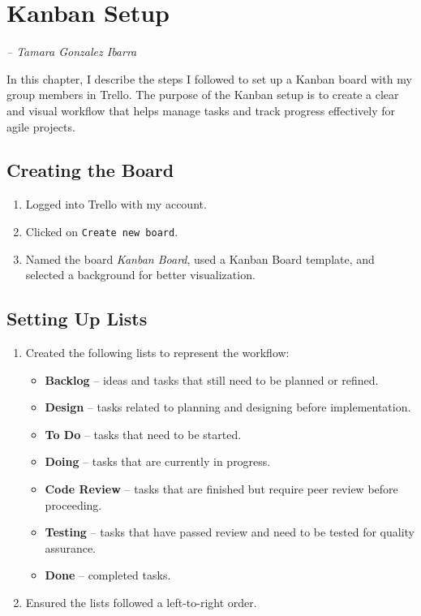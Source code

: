 \chapter{Kanban Setup}
\label{Chapter::KanbanSetup}

\begin{flushleft}
\small{\textit{-- Tamara Gonzalez Ibarra}}
\end{flushleft}

In this chapter, I describe the steps I followed to set up a Kanban board with my group members in Trello. 
The purpose of the Kanban setup is to create a clear and visual workflow that helps manage tasks and track progress effectively for agile projects. 

\section{Creating the Board}
\begin{enumerate}
    \item Logged into Trello with my account.
    \item Clicked on \texttt{Create new board}.
    \item Named the board \textit{Kanban Board}, used a Kanban Board template, and selected a background for better visualization.
\end{enumerate}

\section{Setting Up Lists}
\begin{enumerate}
    \item Created the following lists to represent the workflow:
    \begin{itemize}
        \item \textbf{Backlog} – ideas and tasks that still need to be planned or refined.
        \item \textbf{Design} – tasks related to planning and designing before implementation.
        \item \textbf{To Do} – tasks that need to be started.
        \item \textbf{Doing} – tasks that are currently in progress.
        \item \textbf{Code Review} – tasks that are finished but require peer review before proceeding.
        \item \textbf{Testing} – tasks that have passed review and need to be tested for quality assurance.
        \item \textbf{Done} – completed tasks.
    \end{itemize}
    \item Ensured the lists followed a left-to-right order.
\end{enumerate}

